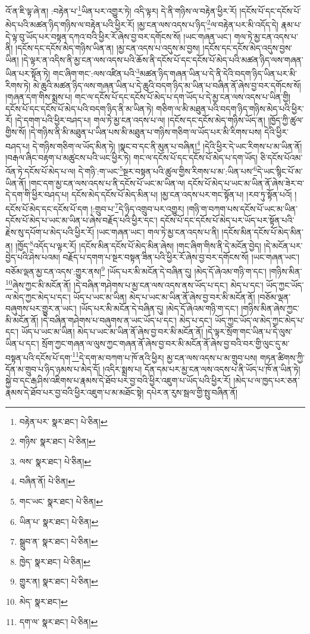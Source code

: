 འོ་ན་ཇི་ལྟ་ཞེ་ན། :བརྟེན་པ་\footnote{བརྟེན་པར་  སྣར་ཐང་།  པེ་ཅིན། }ཡིན་པར་འགྱུར་ཏེ། འདི་ལྟར། དེ་ནི་གཉིས་ལ་བརྟེན་ཕྱིར་རོ། །དངོས་པོ་དང་དངོས་པོ་མེད་པའི་མཚན་ཉིད་གཉིས་ལ་བརྟེན་པའི་ཕྱིར་རོ། །མྱ་ངན་ལས་འདས་པ་ཉིད་\footnote{གཉིས་  སྣར་ཐང་།  པེ་ཅིན། }ལ་བརྟེན་པར་མི་འདོད་དེ། རྣམ་པ་དེ་ལྟ་བུ་ཡོད་པར་བསྟན་དཀའ་བའི་ཕྱིར་རོ་ཞེས་བྱ་བར་དགོངས་སོ། །ཡང་གཞན་ཡང་། གལ་ཏེ་མྱ་ངན་འདས་པ་ནི། །དངོས་དང་དངོས་མེད་གཉིས་ཡིན་ན། །མྱ་ངན་འདས་པ་འདུས་མ་བྱས། །དངོས་དང་དངོས་མེད་འདུས་བྱས་ཡིན། །དེ་ལྟར་ན་འདིས་ནི་མྱ་ངན་ལས་འདས་པའི་ཆོས་ནི་དངོས་པོ་དང་དངོས་པོ་མེད་པའི་མཚན་ཉིད་ལས་གཞན་ཡིན་པར་སྟོན་ཏེ། གང་ཞིག་གང་:ལས་འཛིན་པའི་\footnote{ལས་  སྣར་ཐང་།  པེ་ཅིན། }མཚན་ཉིད་གཞན་ཡིན་པ་དེ་ནི་དེའི་བདག་ཉིད་ཡིན་པར་མི་རིགས་ཏེ། མེ་ཆུའི་མཚན་ཉིད་ལས་གཞན་ཡིན་པ་དེ་ཆུའི་བདག་ཉིད་མ་ཡིན་པ་བཞིན་ནོ་ཞེས་བྱ་བར་དགོངས་སོ། །གཞན་དག་གིས་སྨྲས་པ། གང་ལ་དངོས་པོ་དང་དངོས་པོ་མེད་པ་དག་ཡོད་པ་དེ་མྱ་ངན་ལས་འདས་པ་ཡིན་གྱི། དངོས་པོ་དང་དངོས་པོ་མེད་པའི་བདག་ཉིད་ནི་མ་ཡིན་ཏེ། གཅིག་ལ་མི་མཐུན་པའི་བདག་ཉིད་གཉིས་མེད་པའི་ཕྱིར་རོ། །དེ་དགག་པའི་ཕྱིར་བཤད་པ། གལ་ཏེ་མྱ་ངན་འདས་པ་ལ། །དངོས་དང་དངོས་མེད་གཉིས་ཡོད་ན། །ཁྱོད་ཀྱི་ཚུལ་གྱིས་སོ། །དེ་གཉིས་ནི་མི་མཐུན་པ་ཡིན་པས་མི་མཐུན་པ་གཉིས་གཅིག་ལ་ཡོད་པར་མི་རིགས་པས། དེའི་ཕྱིར་བཤད་པ། དེ་གཉིས་གཅིག་ལ་ཡོད་མིན་ཏེ། །སྣང་བ་དང་ནི་མུན་པ་བཞིན།\footnote{བཞིན་ནོ།  པེ་ཅིན། } །དེའི་ཕྱིར་དེ་ཡང་རིགས་པ་མ་ཡིན་ནོ། །བརྒལ་ཞིང་བརྟག་པ་མཚུངས་པའི་ཡང་ཕྱིར་ཏེ། གང་ལ་དངོས་པོ་དང་དངོས་པོ་མེད་པ་དག་ཡོད། ཅི་དངོས་པོའམ་འོན་ཏེ་དངོས་པོ་མེད་པ་ལ། དེ་གཉི་:ག་ཡང་\footnote{གང་ཡང་  སྣར་ཐང་།  པེ་ཅིན། }སྔར་བསྟན་པའི་ཚུལ་གྱིས་རིགས་པ་མ་:ཡིན་པས་\footnote{ཡིན་པ་  སྣར་ཐང་།  པེ་ཅིན། }དེ་ཡང་སྙིང་པོ་མ་ཡིན་ནོ། །གང་དག་མྱ་ངན་ལས་འདས་པ་ནི་དངོས་པོ་ཡང་མ་ཡིན་ལ། དངོས་པོ་མེད་པ་ཡང་མ་ཡིན་ནོ་ཞེས་ཟེར་བ་དེ་དག་གི་ཕྱིར་བཤད་པ། དངོས་མེད་དངོས་པོ་མེད་མིན་པ། །མྱ་ངན་འདས་པར་གང་སྟོན་པ། །རབ་ཏུ་སྟོན་པའོ། །དངོས་པོ་མེད་དང་དངོས་པོ་དག །:གྲུབ་པ་\footnote{སྒྲུབ་ན་  སྣར་ཐང་།  པེ་ཅིན། }དེ་ཉིད་འགྲུབ་པར་འགྱུར། །གཉི་ག་བཀག་པས་དངོས་པོ་ཡང་མ་ཡིན་དངོས་པོ་མེད་པ་ཡང་མ་ཡིན་པ་ཞེས་བརྗོད་པའི་ཕྱིར་དང་། དངོས་པོ་དང་དངོས་པོ་མེད་པར་ཡོད་པར་སྟོན་པའི་རྗེས་སུ་དཔོག་པ་མེད་པའི་ཕྱིར་རོ། །ཡང་གཞན་ཡང་། གལ་ཏེ་མྱ་ངན་འདས་པ་ནི། །དངོས་མིན་དངོས་པོ་མེད་མིན་ན། །ཁྱོད་\footnote{ཁྱེད་  སྣར་ཐང་།  པེ་ཅིན། }འདོད་པ་ལྟར་རོ། །དངོས་མིན་དངོས་པོ་མེད་མིན་ཞེས། །གང་ཞིག་གིས་ནི་དེ་མངོན་བྱེད། །དེ་མངོན་པར་བྱེད་པའི་ཤེས་པའམ། བརྗོད་པ་དགག་པ་སྔར་བསྟན་ཟིན་པའི་ཕྱིར་རོ་ཞེས་བྱ་བར་དགོངས་སོ། །ཡང་གཞན་ཡང་། བཅོམ་ལྡན་མྱ་ངན་འདས་:གྱུར་ནས།\footnote{གྱུར་ན།  སྣར་ཐང་།  པེ་ཅིན། } །ཡོད་པར་མི་མངོན་དེ་བཞིན་དུ། །མེད་དོ་ཞེའམ་གཉི་ག་དང་། །གཉིས་མིན་\footnote{མེད་  སྣར་ཐང་། }ཞེས་ཀྱང་མི་མངོན་ནོ། །དེ་བཞིན་གཤེགས་པ་མྱ་ངན་ལས་འདས་ནས་ཡོད་པ་དང་། མེད་པ་དང་། ཡོད་ཀྱང་ཡོད་ལ་མེད་ཀྱང་མེད་པ་དང་། ཡོད་པ་ཡང་མ་ཡིན། མེད་པ་ཡང་མ་ཡིན་ནོ་ཞེས་བྱ་བར་མི་མངོན་ནོ། །བཅོམ་ལྡན་བཞུགས་པར་གྱུར་ན་ཡང་། །ཡོད་པར་མི་མངོན་དེ་བཞིན་དུ། །མེད་དོ་ཞེའམ་གཉི་ག་དང་། །གཉིས་མིན་ཞེས་ཀྱང་མི་མངོན་ནོ། །དེ་བཞིན་གཤེགས་པ་བཞུགས་ན་ཡང་ཡོད་པ་དང་། མེད་པ་དང་། ཡོད་ཀྱང་ཡོད་ལ་མེད་ཀྱང་མེད་པ་དང་། ཡོད་པ་ཡང་མ་ཡིན། མེད་པ་ཡང་མ་ཡིན་ནོ་ཞེས་བྱ་བར་མི་མངོན་ནོ། །དེ་ལྟར་སྲོག་གང་ཡིན་པ་དེ་ལུས་ཡིན་པ་དང་། སྲོག་ཀྱང་གཞན་ལ་ལུས་ཀྱང་གཞན་ནོ་ཞེས་བྱ་བར་མི་མངོན་ནོ་ཞེས་བྱ་བའི་བར་གྱི་ལུང་དུ་མ་བསྟན་པའི་དངོས་པོ་དག་\footnote{དག་ལ་  སྣར་ཐང་།  པེ་ཅིན། }དེ་དག་མ་བཀག་པ་ཁོ་ནའི་ཕྱིར། མྱ་ངན་ལས་འདས་པ་མ་གྲུབ་པས། གཏན་ཚིགས་ཀྱི་དོན་མ་གྲུབ་པ་ཉིད་ཉམས་པ་མེད་དོ། །འདིར་སྨྲས་པ། དོན་དམ་པར་མྱ་ངན་ལས་འདས་པ་ནི་ཡོད་པ་ཁོ་ན་ཡིན་ཏེ། སྐྱེ་བ་དང་རྒ་ཤིས་འཇིགས་པ་རྣམས་དེ་ཐོབ་པར་བྱ་བའི་ཕྱིར་འཇུག་པ་ཡོད་པའི་ཕྱིར་རོ། །མེད་པ་ལ་ཁྱད་པར་ཅན་རྣམས་དེ་ཐོབ་པར་བྱ་བའི་ཕྱིར་འཇུག་པ་མ་མཐོང་སྟེ། དཔེར་ན་རུས་སྦལ་གྱི་སྤུ་བཞིན་ནོ། 